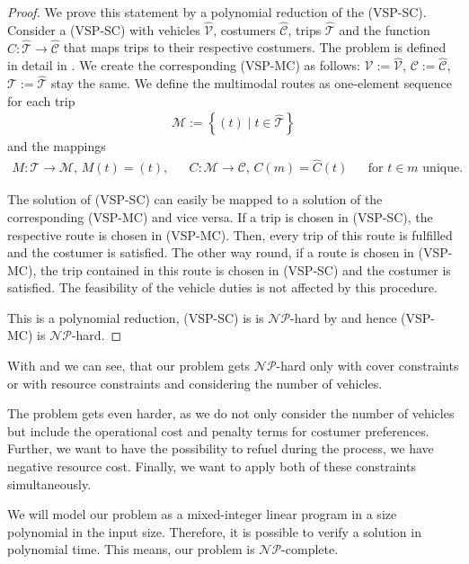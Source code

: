 \begin{proof}

We prove this statement by a polynomial reduction of the (VSP-SC). Consider a (VSP-SC) with vehicles $\hat{\mathcal{V}}$, costumers $\hat{\mathcal{C}}$, trips $\hat{\mathcal{T}}$ and the function $\hat{C}:\hat{\mathcal{T}}\to\hat{\mathcal{C}}$ that maps trips to their respective costumers. The problem is defined in detail in \cite[pp. 5-8]{Kaiser_Knoll}. We create the corresponding (VSP-MC) as follows: $\mathcal{V}:=\hat{\mathcal{V}}$, $\mathcal{C}:=\hat{\mathcal{C}}$, $\mathcal{T}:=\hat{\mathcal{T}}$ stay the same. We define the multimodal routes as one-element sequence for each trip
\begin{align*}
	\mathcal{M}:=\left\{(t)\mid t\in\hat{\mathcal{T}}\right\}
\end{align*}
and the mappings
\begin{align*}
	M:\mathcal{T}\to\mathcal{M} \text{, } M(t) = (t), && C:\mathcal{M}\to\mathcal{C} \text{, } C(m) = \hat{C}(t) && \text{for } t\in m \text{ unique.}
\end{align*}

The solution of (VSP-SC) can easily be mapped to a solution of the corresponding (VSP-MC) and vice versa. If a trip is chosen in (VSP-SC), the respective route is chosen in (VSP-MC). Then, every trip of this route is fulfilled and the costumer is satisfied. The other way round, if a route is chosen in (VSP-MC), the trip contained in this route is chosen in (VSP-SC) and the costumer is satisfied. The feasibility of the vehicle duties is not affected by this procedure.

This is a polynomial reduction, (VSP-SC) is is $\mathcal{NP}$-hard by  and hence (VSP-MC) is $\mathcal{NP}$-hard.

\end{proof}

With  and  we can see, that our problem gets $\mathcal{NP}$-hard only with cover constraints or with resource constraints and considering the number of vehicles.

The problem gets even harder, as we do not only consider the number of vehicles but include the operational cost and penalty terms for costumer preferences. Further, we want to have the possibility to refuel during the process, \ie we have negative resource cost. Finally, we want to apply both of these constraints simultaneously. 

We will model our problem as a mixed-integer linear program in a size polynomial in the input size. Therefore, it is possible to verify a solution in polynomial time. This means, our problem is $\mathcal{NP}$-complete.

